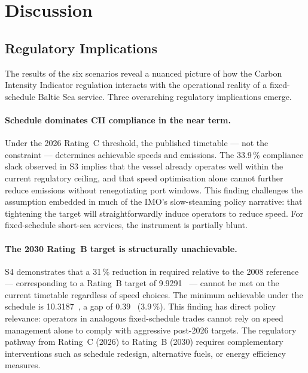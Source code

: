 \section{Discussion}
\label{ch:discussion}

\subsection{Regulatory Implications}
\label{sec:disc:regulatory}

The results of the six scenarios reveal a nuanced picture of how the
Carbon Intensity Indicator regulation interacts with the operational reality
of a fixed-schedule Baltic Sea service.  Three overarching regulatory
implications emerge.

\paragraph{Schedule dominates CII compliance in the near term.}
Under the 2026 Rating~C threshold, the published timetable --- not the
\CII{} constraint --- determines achievable speeds and emissions.  The
33.9\,\% compliance slack observed in S3 implies that the vessel already
operates well within the current regulatory ceiling, and that speed
optimisation alone cannot further reduce emissions without renegotiating
port windows.  This finding challenges the assumption embedded in much of
the IMO's slow-steaming policy narrative: that tightening the \CII{}
target will straightforwardly induce operators to reduce speed.  For
fixed-schedule short-sea services, the instrument is partially blunt.

\paragraph{The 2030 Rating~B target is structurally unachievable.}
S4 demonstrates that a 31\,\% reduction in required \CII{} relative to
the 2008 reference --- corresponding to a Rating~B target of
9.9291~\gGTnm{} --- cannot be met on the current timetable regardless of
speed choices.  The minimum achievable \CII{} under the schedule is
10.3187~\gGTnm{}, a gap of 0.39~\gGTnm{} (3.9\,\%).  This finding has
direct policy relevance: operators in analogous fixed-schedule trades cannot
rely on speed management alone to comply with aggressive post-2026 targets.
The regulatory pathway from Rating~C (2026) to Rating~B (2030) requires
complementary interventions such as schedule redesign, alternative fuels,
or energy efficiency measures.

